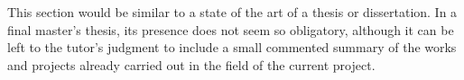 
\nonzeroparskip This section would be similar to a state of the art of a thesis or dissertation. In a final master's thesis, its presence does not seem so obligatory, although it can be left to the tutor's judgment to include a small commented summary of the works and projects already carried out in the field of the current project. 
